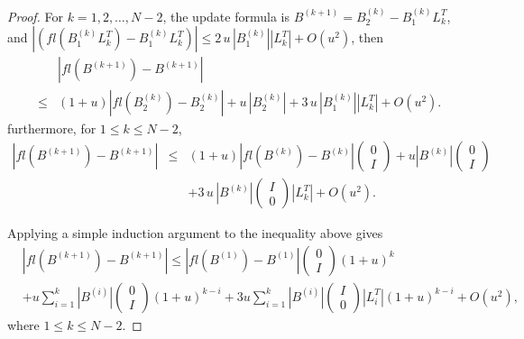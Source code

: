 \documentclass[11pt]{article}
\begin{document}
\begin{proof}
For $k=1,2,\dots,N-2$, the update formula is $B^{(k+1)} = B_2^{(k)} - B_1^{(k)} L_k^T$, and $\left| \left(fl\left(B_1^{(k)}L_k^T\right)-B_1^{(k)}L_k^T\right) \right| \le 2 \, u \, \left|B_1^{(k)}\right| \left|L_k^T\right| + O(u^2)$, then
\begin{eqnarray*}
&&\left|fl\left(B^{(k+1)}\right)-B^{(k+1)}\right| \\
&\le& \left(1+u\right) \left|fl\left(B_2^{(k)}\right)-B_2^{(k)}\right| + u \, \left|B_2^{(k)}\right| + 3\, u \, \left|B_1^{(k)}\right| \left|L_k^T\right| + O(u^2).
\end{eqnarray*}
furthermore, for $1 \le k \le N-2$,
\begin{eqnarray*}
\left|fl\left(B^{(k+1)}\right)-B^{(k+1)}\right| &\le& \left(1+u\right) \left|fl\left(B^{(k)}\right)-B^{(k)}\right|\left(
\begin{array}{c}
     0  \\
     I 
\end{array}
\right) + 
u \left|B^{(k)}\right|\left(
\begin{array}{c}
     0  \\
     I 
\end{array}
\right) \\
&&+ 3\, u \, \left|B^{(k)}\right| \left(
\begin{array}{c}
     I  \\
     0 
\end{array}
\right)
\left|L_k^T\right| + O(u^2).
\end{eqnarray*}

Applying a simple induction argument to the inequality above gives
\begin{align*}
&\left|fl\left(B^{(k+1)}\right)  - B^{(k+1)}\right| 
\le \left| fl \left(B^{(1)} \right)  - B^{(1)}\right|\begin{pmatrix}
0\\I
\end{pmatrix} (1+u)^{k} \\
& + u  \sum_{i=1}^{k} \left| B^{(i)} \right| \begin{pmatrix}
0\\I
\end{pmatrix} (1+u)^{k-i} + 3 u \sum_{i = 1}^{k} \left| B^{(i)} \right| \begin{pmatrix}
I\\0
\end{pmatrix} \left| L_i^T \right| (1+u)^{k-i} + O(u^2),
\end{align*}
where $1 \le k \le N-2$.


\end{proof}
\end{document}
